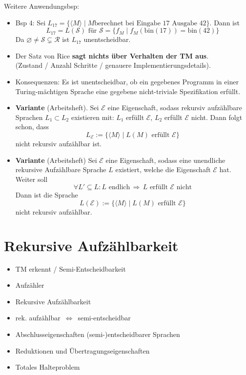 \documentclass[a4paper,graphics,11pt]{article}
\newcommand{\godel}[1]{\langle #1 \rangle}
\newcommand{\Iff}[0]{\,\Longleftrightarrow\,}
\begin{document}
Weitere Anwendungsbsp:
\begin{itemize}
    \item Bsp 4: Sei $L_{17} = \{\godel{M} \mid M \text{berechnet bei Eingabe 17 Ausgabe 42}\}$. Dann ist
        $$
            L_{17} = L(\mathcal{S})\text{ für } \mathcal{S} = \{f_M \mid f_M(\text{bin}(17)) = \text{bin}(42)\}
        $$
        Da $\varnothing \neq \mathcal{S} \subsetneq \mathcal{R}$ ist $L_{17}$ unentscheidbar.
    \item Der Satz von Rice \textbf{sagt nichts über Verhalten der TM aus}.\\
        (Zustand / Anzahl Schritte / genauere Implementierungsdetails).
    \item Konsequenzen: Es ist unentscheidbar, ob ein gegebenes Programm in einer
        Turing-mächtigen Sprache eine gegebene nicht-triviale Spezifikation erfüllt.
    \item \textbf{Variante} (Arbeitsheft). Sei $\mathcal{E}$ eine Eigenschaft, sodass
        rekursiv aufzählbare Sprachen $L_1 \subset L_2$ existieren mit:
        $L_1$ erfüllt $\mathcal{E}$, $L_2$ erfüllt $\mathcal{E}$ nicht. Dann folgt schon, dass
        $$
            L_\mathcal{E} := \{\godel{M} \mid L(M) \text{ erfüllt } \mathcal{E}\}
        $$
        nicht rekursiv aufzählbar ist.
    \item \textbf{Variante} (Arbeitsheft) Sei $\mathcal{E}$ eine Eigenschaft, sodass
        eine unendliche rekursive Aufzählbare Sprache $L$ existiert, welche
        die Eigenschaft $\mathcal{E}$ hat. Weiter soll
        $$
            \forall L' \subseteq L: L \text{ endlich}
            \,\Longrightarrow\,
            L \text{ erfüllt } \mathcal{E} \text{ nicht}
        $$
        Dann ist die Sprache
        $$
            L(\mathcal{E}) := \{\godel{M} \mid L(M) \text{ erfüllt }\mathcal{E}\}
        $$
        nicht rekursiv aufzählbar.
\end{itemize}


\newpage

\section{Rekursive Aufzählbarkeit}

\begin{itemize}
    \item TM erkennt / Semi-Entscheidbarkeit
    \item Aufzähler
    \item Rekursive Aufzählbarkeit
    \item rek. aufzählbar $\Iff$ semi-entscheidbar
    \item Abschlusseigenschaften (semi-)entscheidbarer Sprachen
    \item Reduktionen und Übertragungseigenschaften
    \item Totales Halteproblem
\end{itemize}
\end{document}
